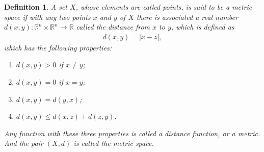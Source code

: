 \documentclass[10pt]{book}
\newtheorem{definition}{Definition}[chapter]
\theoremstyle{definition}
\numberwithin{equation}{chapter}
\begin{document}
\begin{definition}
A set $X$, whose elements are called points, is said to be a metric space if with any two points $x$ and $y$ of $X$ there is associated a real number $d(x,y): \mathbb{R}^n \times \mathbb{R}^n \rightarrow \mathbb{R}$ called the distance from $x$ to $y$, which is defined as 
\begin{align*}
    d(x,y) = \left|x - z\right|,
\end{align*}
which has the following properties:
\begin{enumerate}[label=(\alph*)]
    \item $d(x,y) > 0$ if $x\neq y$;
    \item $d(x,y) = 0$ if $x = y$;
    \item $d(x,y) = d(y,x)$;
    \item $d(x,y) \leq d(x,z) + d(z,y)$.
\end{enumerate}
Any function with these three properties is called a distance function, or a metric. And the pair $(X,d)$ is called the metric space.
\end{definition}

\medskip
\end{document}
